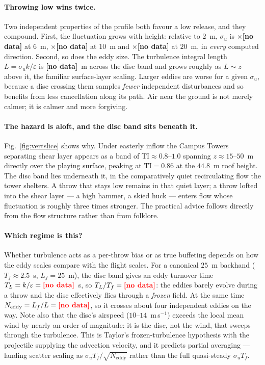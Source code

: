 \documentclass[11pt,letterpaper]{article}
\newcommand{\MISSINGNUM}{\textbf{\color{red}[no data]}}%
\newcommand{\VertSigGrowthSix}{\MISSINGNUM}\newcommand{\VertSigGrowthTen}{\MISSINGNUM}%
\newcommand{\VertSigGrowthTwenty}{\MISSINGNUM}\newcommand{\VertLintRange}{\MISSINGNUM}%
\newcommand{\VertTLrange}{\MISSINGNUM}\newcommand{\VertTLratioRange}{\MISSINGNUM}%
\newcommand{\VertNeddyRange}{\MISSINGNUM}%
\begin{document}
\paragraph{Throwing low wins twice.}
Two independent properties of the profile both favour a low release, and they
compound. First, the fluctuation grows with height: relative to $2$~m,
$\sigma_u$ is $\times$\VertSigGrowthSix{} at $6$~m, $\times$\VertSigGrowthTen{}
at $10$~m and $\times$\VertSigGrowthTwenty{} at $20$~m, in \emph{every}
computed direction. Second, so does the eddy size. The turbulence integral
length $L = \sigma_u k/\varepsilon$ is \VertLintRange{}~m across the disc band
and grows roughly as $L \sim z$ above it, the familiar surface-layer scaling.
Larger eddies are worse for a given $\sigma_u$, because a disc crossing them
samples \emph{fewer} independent disturbances and so benefits from less
cancellation along its path. Air near the ground is not merely calmer; it is
calmer and more forgiving.

\paragraph{The hazard is aloft, and the disc band sits beneath it.}
Fig.~\ref{fig:vertslice} shows why. Under easterly inflow the Campus Towers
separating shear layer appears as a band of $\mathrm{TI} \approx 0.8$--$1.0$
spanning $z \approx 15$--$50$~m directly over the playing surface, peaking at
$\mathrm{TI} = 0.86$ at the $44.8$~m roof height. The disc band lies underneath
it, in the comparatively quiet recirculating flow the tower shelters. A throw
that stays low remains in that quiet layer; a throw lofted into the shear layer
--- a high hammer, a skied huck --- enters flow whose fluctuation is roughly
three times stronger. The practical advice follows directly from the flow
structure rather than from folklore.

\paragraph{Which regime is this?}
Whether turbulence acts as a per-throw bias or as true buffeting depends on how
the eddy scales compare with the flight scales. For a canonical $25$~m backhand
($T_f \approx 2.5$~s, $L_f = 25$~m), the disc band gives an eddy turnover time
$T_L = k/\varepsilon = \VertTLrange{}$~s, so
$T_L/T_f = \VertTLratioRange{}$: the eddies barely evolve during a throw and the
disc effectively flies through a \emph{frozen} field. At the same time
$N_{\text{eddy}} = L_f/L = \VertNeddyRange{}$, so it crosses about four
independent eddies on the way. Note also that the disc's airspeed
($10$--$14$~m\,s$^{-1}$) exceeds the local mean wind by nearly an order of
magnitude: it is the disc, not the wind, that sweeps through the turbulence.
This is Taylor's frozen-turbulence hypothesis with the projectile supplying the
advection velocity, and it predicts partial averaging --- landing scatter
scaling as $\sigma_u T_f / \sqrt{N_{\text{eddy}}}$ rather than the full
quasi-steady $\sigma_u T_f$.
\end{document}
